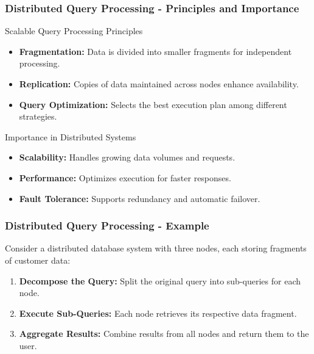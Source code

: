 \documentclass[aspectratio=169]{beamer}
\begin{document}
\begin{frame}[fragile]
    \frametitle{Distributed Query Processing - Principles and Importance}
    \begin{block}{Scalable Query Processing Principles}
        \begin{itemize}
            \item \textbf{Fragmentation:} 
                Data is divided into smaller fragments for independent processing.
            \item \textbf{Replication:}
                Copies of data maintained across nodes enhance availability.
            \item \textbf{Query Optimization:}
                Selects the best execution plan among different strategies.
        \end{itemize}
    \end{block}

    \begin{block}{Importance in Distributed Systems}
        \begin{itemize}
            \item \textbf{Scalability:} Handles growing data volumes and requests.
            \item \textbf{Performance:} Optimizes execution for faster responses.
            \item \textbf{Fault Tolerance:} Supports redundancy and automatic failover.
        \end{itemize}
    \end{block}
\end{frame}

\begin{frame}[fragile]
    \frametitle{Distributed Query Processing - Example}
    Consider a distributed database system with three nodes, each storing fragments of customer data:
    
    \begin{enumerate}
        \item \textbf{Decompose the Query:} Split the original query into sub-queries for each node.
        \item \textbf{Execute Sub-Queries:} Each node retrieves its respective data fragment.
        \item \textbf{Aggregate Results:} Combine results from all nodes and return them to the user.
    \end{enumerate}
\end{frame}
\end{document}
